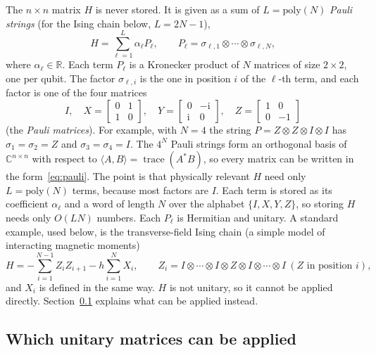 \documentclass[11pt,a4paper]{article}
\newcommand{\C}{\mathbb{C}}
\begin{document}
The $n\times n$ matrix $H$ is never stored. It is given as a sum of
$L=\mathrm{poly}(N)$ \emph{Pauli strings} (for the Ising chain below, $L=2N-1$),
\begin{equation}\label{eq:pauli}
  H = \sum_{\ell=1}^{L} \alpha_\ell P_\ell,\qquad
  P_\ell = \sigma_{\ell,1}\otimes\cdots\otimes\sigma_{\ell,N},
\end{equation}
where $\alpha_\ell\in\mathbb{R}$. Each term $P_\ell$ is a Kronecker product of
$N$ matrices of size $2\times2$, one per qubit. The factor
$\sigma_{\ell,i}$ is the one in position $i$ of the $\ell$-th term, and
each factor is one of the four matrices
\[
  I,\quad
  X=\begin{bmatrix}0&1\\1&0\end{bmatrix},\quad
  Y=\begin{bmatrix}0&-\mathrm{i}\\ \mathrm{i}&0\end{bmatrix},\quad
  Z=\begin{bmatrix}1&0\\0&-1\end{bmatrix}
\]
(the \emph{Pauli matrices}). For example, with $N=4$ the string
$P=Z\otimes Z\otimes I\otimes I$ has $\sigma_1=\sigma_2=Z$ and
$\sigma_3=\sigma_4=I$. The $4^N$ Pauli strings form an orthogonal basis of
$\C^{n\times n}$ with respect to $\langle A,B\rangle=\operatorname{trace}(A^*B)$, so
every matrix can be written in the form~\eqref{eq:pauli}. The point is
that physically relevant $H$ need only $L=\mathrm{poly}(N)$ terms, because
most factors are $I$. Each term is stored as its coefficient $\alpha_\ell$
and a word of length $N$ over the alphabet $\{I,X,Y,Z\}$, so storing $H$
needs only $O(LN)$ numbers. Each $P_\ell$ is Hermitian and
unitary. A standard example, used below, is the transverse-field Ising
chain (a simple model of interacting magnetic moments)
\[
  H = -\sum_{i=1}^{N-1} Z_iZ_{i+1} - h\sum_{i=1}^N X_i,
  \qquad Z_i = I\otimes\cdots\otimes I\otimes Z\otimes I\otimes\cdots\otimes I
  \ (Z \text{ in position } i),
\]
and $X_i$ is defined in the same way. $H$ is not unitary, so it cannot
be applied directly. Section~\ref{sec:unitaries} explains what can be
applied instead.

\subsection{Which unitary matrices can be applied}\label{sec:unitaries}
\end{document}
